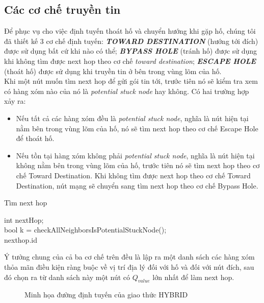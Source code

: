 \documentclass[12pt]{report}
\begin{document}
\subsection{Các cơ chế truyền tin}
\label{sec:4.5.1}
Để phục vụ cho việc định tuyến thoát hố và chuyển hướng khi gặp hố, chúng tôi đã thiết kế 3 cơ chế định tuyến: \textbf{\textit{TOWARD DESTINATION}} (hướng tới đích) được sử dụng bất cứ khi nào có thể; \textbf{\textit{BYPASS HOLE}} (tránh hố) được sử dụng khi không tìm được next hop theo cơ chế \textit{toward destination}; \textbf{\textit{ESCAPE HOLE}} (thoát hố) được sử dụng khi truyền tin ở bên trong vùng lõm của hố.\\
Khi một nút muốn tìm next hop để gửi gói tin tới, trước tiên nó sẽ kiểm tra xem có hàng xóm nào của nó là \textit{potential stuck node} hay không. Có hai trường hợp xảy ra:
\begin{itemize}
\item Nếu tất cả các hàng xóm đều là \textit{potential stuck node}, nghĩa là nút hiện tại nằm bên trong vùng lõm của hố, nó sẽ tìm next hop theo cơ chế Escape Hole để thoát hố. 
\item Nếu tồn tại hàng xóm không phải \textit{potential stuck node}, nghĩa là nút hiện tại không nằm bên trong vùng lõm của hố, trước tiên nó sẽ tìm next hop theo cơ chế Toward Destination. Khi không tìm được next hop theo cơ chế Toward Destination, nút mạng sẽ chuyển sang tìm next hop theo cơ chế Bypass Hole.
\end{itemize}
\begin{center}
\begin{algorithm}[H]
\setcounter{AlgoLine}{0}
\caption{Tìm next hop}\label{findnexthop}
int nextHop;\\
bool k = checkAllNeighborsIsPotentialStuckNode();\\
\Return nexthop.id
\end{algorithm}
\end{center}
Ý tưởng chung của cả ba cơ chế trên đều là lập ra một danh sách các hàng xóm thỏa mãn điều kiện ràng buộc về vị trí địa lý đối với hố và đối với nút đích, sau đó chọn ra từ danh sách này một nút có $Q_{value}$ lớn nhất để làm next hop.
\begin{figure}[H]
    \centering
    
    \caption[Minh họa đường định tuyến của giao thức HYBRID]{Minh họa đường định tuyến của giao thức HYBRID}
    \label{fig:fig4}
\end{figure}
\end{document}
